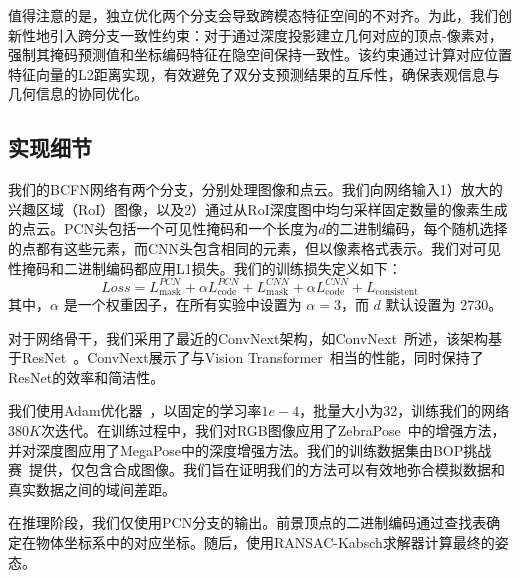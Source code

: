 \par 值得注意的是，独立优化两个分支会导致跨模态特征空间的不对齐。为此，我们创新性地引入跨分支一致性约束：对于通过深度投影建立几何对应的顶点-像素对，强制其掩码预测值和坐标编码特征在隐空间保持一致性。该约束通过计算对应位置特征向量的L2距离实现，有效避免了双分支预测结果的互斥性，确保表观信息与几何信息的协同优化。

\subsection{实现细节}

我们的BCFN网络有两个分支，分别处理图像和点云。我们向网络输入1）放大的兴趣区域（RoI）图像，以及2）通过从RoI深度图中均匀采样固定数量的像素生成的点云。PCN头包括一个可见性掩码和一个长度为$d$的二进制编码，每个随机选择的点都有这些元素，而CNN头包含相同的元素，但以像素格式表示。我们对可见性掩码和二进制编码都应用L1损失。我们的训练损失定义如下：
\begin{equation}
Loss = L_\text{mask}^{PCN} + \alpha L_\text{code}^{PCN} + L_\text{mask}^{CNN} + \alpha L_\text{code}^{CNN} + L_{\text{consistent}}
\end{equation}
其中，$\alpha$ 是一个权重因子，在所有实验中设置为 $\alpha = 3$，而 $d$ 默认设置为 $2730$。

对于网络骨干，我们采用了最近的ConvNext架构，如ConvNext~\cite{Liu2022ACF}所述，该架构基于ResNet~\cite{He2015DeepRL}。ConvNext展示了与Vision Transformer~\cite{Dosovitskiy2020AnII}相当的性能，同时保持了ResNet的效率和简洁性。

我们使用Adam优化器~\cite{Kingma2014AdamAM}，以固定的学习率$1e-4$，批量大小为32，训练我们的网络$380K$次迭代。在训练过程中，我们对RGB图像应用了ZebraPose~\cite{su2022zebrapose}中的增强方法，并对深度图应用了MegaPose\cite{Labbe2022MegaPose6P}中的深度增强方法。我们的训练数据集由BOP挑战赛~\cite{hodan2024bop}提供，仅包含合成图像。我们旨在证明我们的方法可以有效地弥合模拟数据和真实数据之间的域间差距。

在推理阶段，我们仅使用PCN分支的输出。前景顶点的二进制编码通过查找表确定在物体坐标系中的对应坐标。随后，使用RANSAC-Kabsch求解器计算最终的姿态。